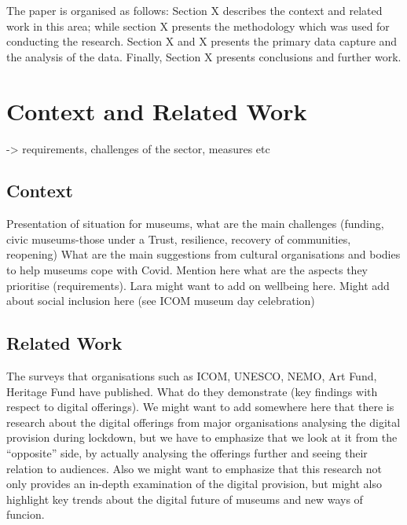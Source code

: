 \documentclass{egpubl}
\begin{document}
The paper is organised as follows: Section X describes the context and related work in this area; while section X presents the methodology which was used for conducting the research. Section X and X presents the primary data capture and the analysis of the data. Finally, Section X presents conclusions and further work.  

\section{Context and Related Work}
-> requirements, challenges of the sector, measures etc


\subsection{Context}
Presentation of situation for museums, what are the main challenges (funding, civic museums-those under a Trust, resilience, recovery of communities, reopening)
What are the main suggestions from cultural organisations and bodies to help museums cope with Covid. Mention here what are the aspects they prioritise (requirements).
Lara might want to add on wellbeing here.
Might add about social inclusion here (see ICOM museum day celebration)
\subsection{Related Work}
The surveys that organisations such as ICOM, UNESCO, NEMO, Art Fund, Heritage Fund have published. What do they demonstrate (key findings with respect to digital offerings).
We might want to add somewhere here that there is research about the digital offerings from major organisations analysing the digital provision during lockdown, but we have to emphasize that we look at it from the “opposite” side, by actually analysing the offerings further and seeing their relation to audiences. Also we might want to emphasize that this research not only provides an in-depth examination of the digital provision, but might also highlight key trends about the digital future of museums and new ways of funcion.

\end{document}
